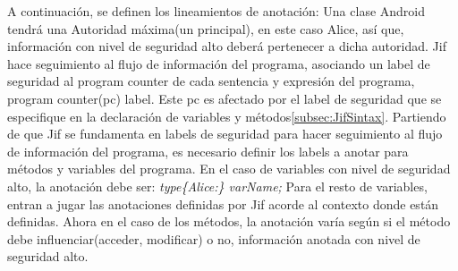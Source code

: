 A continuación, se definen los lineamientos de anotación:\newline
Una clase Android tendrá una Autoridad máxima(un principal), en este caso Alice,
así que, información con nivel de seguridad alto deberá pertenecer a dicha
autoridad.\newline
Jif hace seguimiento al flujo de información del programa, asociando un label
de seguridad al program counter de cada sentencia y expresión del programa,
program counter(pc) label. Este pc es afectado por el label de seguridad que se
especifique en la declaración de variables y métodos\ref{subsec:JifSintax}. 
Partiendo de que Jif se fundamenta en labels de seguridad para hacer seguimiento
al flujo de información del programa, es necesario definir los labels a
anotar para métodos y variables del programa.\newline
En el caso de variables con nivel de seguridad  alto, la anotación debe
ser:\newline
\emph{ type\{Alice:\} varName; }\newline
Para el resto de variables, entran a jugar las anotaciones definidas por Jif
acorde al contexto donde están definidas.\newline
Ahora en el caso de los métodos, la anotación varía según si el método debe
influenciar(acceder, modificar) o no, información anotada con nivel de seguridad
alto.

